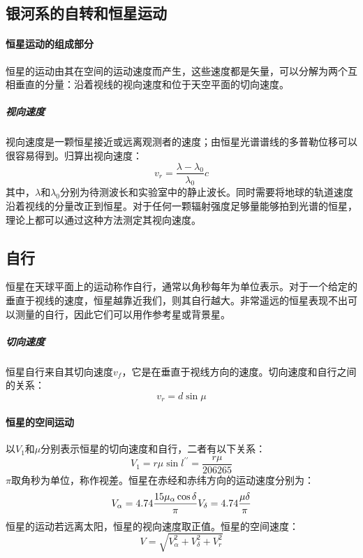 \subsection{银河系的自转和恒星运动}
\paragraph{恒星运动的组成部分}恒星的运动由其在空间的运动速度而产生，这些速度都是矢量，可以分解为两个互相垂直的分量：沿着视线的视向速度和位于天空平面的切向速度。
\subparagraph{视向速度}
视向速度是一颗恒星接近或远离观测者的速度；由恒星光谱谱线的多普勒位移可以很容易得到。归算出视向速度：
\begin{equation}
	v_{r}=\frac{\lambda-\lambda_{0}}{\lambda_{0}}c
\end{equation}
其中，$\lambda$和$\lambda_{0}$分别为待测波长和实验室中的静止波长。同时需要将地球的轨道速度沿着视线的分量改正到恒星。对于任何一颗辐射强度足够量能够拍到光谱的恒星，理论上都可以通过这种方法测定其视向速度。
\subsection{自行}恒星在天球平面上的运动称作自行，通常以角秒每年为单位表示。对于一个给定的垂直于视线的速度，恒星越靠近我们，则其自行越大。非常遥远的恒星表现不出可以测量的自行，因此它们可以用作参考星或背景星。
\subparagraph{切向速度}恒星自行来自其切向速度$v_{f}$，它是在垂直于视线方向的速度。切向速度和自行之间的关系：
\begin{equation}
	v_{r}=d \sin\mu
\end{equation}
\paragraph{恒星的空间运动}以$V_{1}$和$\mu$分别表示恒星的切向速度和自行，二者有以下关系：
\begin{equation}
	V_{1}=r\mu\sin l^{\prime\prime}=\frac{r\mu}{206265}
\end{equation}
$\pi$取角秒为单位，称作视差。恒星在赤经和赤纬方向的运动速度分别为：
\begin{equation}
	V_{\alpha}=4.74\frac{15\mu_{\alpha}\cos \delta}{\pi}\\
	V_{\delta}=4.74\frac{\mu\delta}{\pi}
\end{equation}
恒星的运动若远离太阳，恒星的视向速度取正值。恒星的空间速度：
\begin{equation}
	V=\sqrt{V_{\alpha}^2+V_{\delta}^2+V_{r}^2}
\end{equation}

